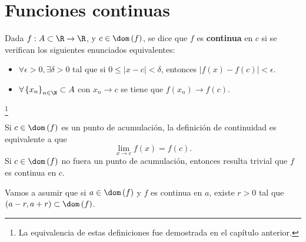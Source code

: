 \chapter{Funciones continuas}
\begin{fdefinition}[Continuidad]
\normalfont Dada $\displaystyle f : A \subset \R \to \R $,  y $\displaystyle c \in \dom\left(f\right) $, se dice que $\displaystyle f $ es \textbf{continua} en $\displaystyle c $ si se verifican los siguientes enunciados equivalentes:
\begin{itemize}
\item $\displaystyle \forall \epsilon > 0, \exists \delta > 0 $ tal que si $\displaystyle 0 \leq \left|x - c\right|<\delta $, entonces $\displaystyle \left|f\left(x\right)-f\left(c\right)\right| < \epsilon  $.
\item $\displaystyle \forall \left\{ x_{n}\right\} _{n\in \N} \subset A $ con $\displaystyle x_{n} \to c $ se tiene que $\displaystyle f\left(x_{n}\right) \to f\left(c\right) $.
\end{itemize}
\end{fdefinition}
\footnote{La equivalencia de estas definiciones fue demostrada en el capítulo anterior.} 
\begin{observation}
\normalfont Si $\displaystyle c \in \dom\left(f\right) $ es un punto de acumulación, la definición de continuidad es equivalente a que 
\[\lim_{x \to c}f\left(x\right) = f\left(c\right) .\]
Si $\displaystyle c \in \dom\left(f\right) $ no fuera un punto de acumulación, entonces resulta trivial que $\displaystyle f $ es continua en $\displaystyle c $. 
\end{observation}
\begin{observation}
\normalfont Vamos a asumir que si $\displaystyle a \in \dom\left(f\right) $ y $\displaystyle f $ es continua en $\displaystyle a $, existe $\displaystyle r > 0 $ tal que $\displaystyle \left(a - r, a + r\right) \subset \dom\left(f\right) $.
\end{observation}

